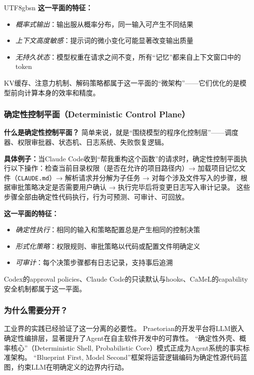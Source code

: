 \documentclass[11pt,a4paper]{article}
\begin{document}
\begin{CJK*}{UTF8}{gbsn}
\textbf{这一平面的特征：}
\begin{itemize}[nosep]
\item \textit{概率式输出}：输出服从概率分布，同一输入可产生不同结果
\item \textit{上下文高度敏感}：提示词的微小变化可能显著改变输出质量
\item \textit{无持久状态}：模型权重在请求之间不变，所有``记忆''都来自上下文窗口中的token
\end{itemize}

KV缓存、注意力机制、解码策略都属于这一平面的``微架构''——它们优化的是模型前向计算本身的效率和精度。

\subsubsection{确定性控制平面（Deterministic Control Plane）}

\textbf{什么是确定性控制平面？}
简单来说，就是``围绕模型的程序化控制层''——调度器、权限审批器、状态机、日志系统、失败恢复逻辑。

\textbf{具体例子：}当Claude Code收到``帮我重构这个函数''的请求时，确定性控制平面执行以下操作：检查当前目录权限（是否在允许的项目路径内）→ 加载项目记忆文件（\texttt{CLAUDE.md}）→ 解析请求并分解为子任务 → 对每个涉及文件写入的步骤，根据审批策略决定是否需要用户确认 → 执行完毕后将变更日志写入审计记录\cite{anthropic_claudecode_security_2026}。
这些步骤全部由确定性代码执行，行为可预测、可审计、可回放。

\textbf{这一平面的特征：}
\begin{itemize}[nosep]
\item \textit{确定性执行}：相同的输入和策略配置总是产生相同的控制决策
\item \textit{形式化策略}：权限规则、审批策略以代码或配置文件明确定义
\item \textit{可审计}：每个决策步骤都有日志记录，支持事后追溯
\end{itemize}

Codex的approval policies\cite{openai_codex_approvals_2026}、Claude Code的只读默认与hooks\cite{anthropic_claudecode_security_2026}、CaMeL的capability安全机制\cite{debenedetti2025camel}都属于这一平面。

\subsubsection{为什么需要分开？}

工业界的实践已经验证了这一分离的必要性。
Praetorian的开发平台将LLM嵌入确定性编排层，显著提升了Agent在自主软件开发中的可靠性\cite{praetorian2025deterministic}。
``确定性外壳、概率核心''（Deterministic Shell, Probabilistic Core）模式正成为Agent系统的事实标准架构\cite{towardsai2025deterministicshell}。
``Blueprint First, Model Second''框架将运营逻辑编码为确定性源代码蓝图，约束LLM在明确定义的边界内行动\cite{blueprintfirst2025}。


\end{CJK*}
\end{document}
